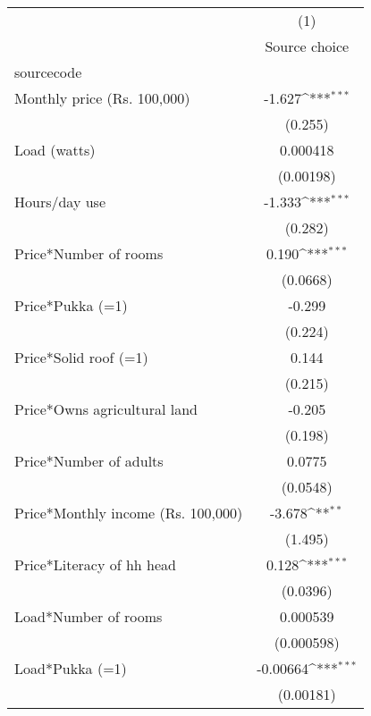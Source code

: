 {
\def\sym#1{\ifmmode^{#1}\else\(^{#1}\)\fi}
\begin{tabular}{l*{1}{c}}
\toprule
                    &\multicolumn{1}{c}{(1)}\\
                    &\multicolumn{1}{c}{Source choice}\\
\midrule
sourcecode          &                     \\
Monthly price (Rs. 100,000)&      -1.627\sym{***}\\
                    &     (0.255)         \\
\addlinespace
Load (watts)        &    0.000418         \\
                    &   (0.00198)         \\
\addlinespace
Hours/day use       &      -1.333\sym{***}\\
                    &     (0.282)         \\
\addlinespace
Price*Number of rooms&       0.190\sym{***}\\
                    &    (0.0668)         \\
\addlinespace
Price*Pukka (=1)    &      -0.299         \\
                    &     (0.224)         \\
\addlinespace
Price*Solid roof (=1)&       0.144         \\
                    &     (0.215)         \\
\addlinespace
Price*Owns agricultural land&      -0.205         \\
                    &     (0.198)         \\
\addlinespace
Price*Number of adults&      0.0775         \\
                    &    (0.0548)         \\
\addlinespace
Price*Monthly income (Rs. 100,000)&      -3.678\sym{**} \\
                    &     (1.495)         \\
\addlinespace
Price*Literacy of hh head&       0.128\sym{***}\\
                    &    (0.0396)         \\
\addlinespace
Load*Number of rooms&    0.000539         \\
                    &  (0.000598)         \\
\addlinespace
Load*Pukka (=1)     &    -0.00664\sym{***}\\
                    &   (0.00181)         \\

\end{tabular}}
